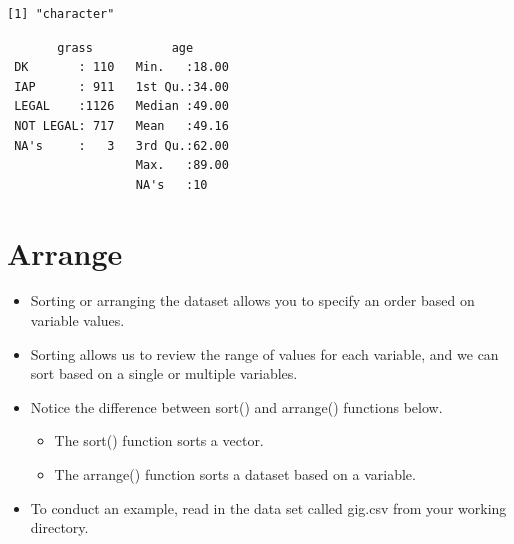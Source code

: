 \documentclass[
  letterpaper,
  DIV=11,
  numbers=noendperiod]{scrreprt}
\newenvironment{Shaded}{\begin{snugshade}}{\end{snugshade}}
\newcommand{\AttributeTok}[1]{\textcolor[rgb]{0.40,0.45,0.13}{#1}}
\newcommand{\CommentTok}[1]{\textcolor[rgb]{0.37,0.37,0.37}{#1}}
\newcommand{\FloatTok}[1]{\textcolor[rgb]{0.68,0.00,0.00}{#1}}
\newcommand{\FunctionTok}[1]{\textcolor[rgb]{0.28,0.35,0.67}{#1}}
\newcommand{\NormalTok}[1]{\textcolor[rgb]{0.00,0.23,0.31}{#1}}
\newcommand{\OtherTok}[1]{\textcolor[rgb]{0.00,0.23,0.31}{#1}}
\newcommand{\SpecialCharTok}[1]{\textcolor[rgb]{0.37,0.37,0.37}{#1}}
\newcommand{\StringTok}[1]{\textcolor[rgb]{0.13,0.47,0.30}{#1}}
\providecommand{\tightlist}{%
  \setlength{\itemsep}{0pt}\setlength{\parskip}{0pt}}\usepackage{longtable,booktabs,array}
\begin{document}
\begin{verbatim}
[1] "character"
\end{verbatim}

\begin{Shaded}
\end{Shaded}

\begin{verbatim}
       grass           age       
 DK       : 110   Min.   :18.00  
 IAP      : 911   1st Qu.:34.00  
 LEGAL    :1126   Median :49.00  
 NOT LEGAL: 717   Mean   :49.16  
 NA's     :   3   3rd Qu.:62.00  
                  Max.   :89.00  
                  NA's   :10     
\end{verbatim}


\chapter{Arrange}\label{arrange}

\begin{itemize}
\tightlist
\item
  Sorting or arranging the dataset allows you to specify an order based
  on variable values.
\item
  Sorting allows us to review the range of values for each variable, and
  we can sort based on a single or multiple variables.
\item
  Notice the difference between sort() and arrange() functions below.

  \begin{itemize}
  \tightlist
  \item
    The sort() function sorts a vector.
  \item
    The arrange() function sorts a dataset based on a variable.
  \end{itemize}
\item
  To conduct an example, read in the data set called gig.csv from your
  working directory.
\end{itemize}
\end{document}
